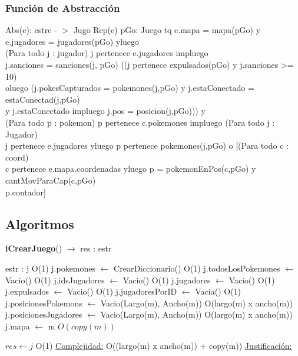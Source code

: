 \begin{Representacion}
\subsubsection{Funci\'on de Abstracci\'on}	
	Abs(e): estre - $>$ Jugo {Rep(e)} 
 pGo: Juego tq e.mapa = mapa(pGo) y e.jugadores = jugadores(pGo) yluego \\
 (Para todo j : jugador) j pertenece e.jugadores impluego 
 \\ j.sanciones = sanciones(j, pGo) ((j pertenece expulsados(pGo) y j.sanciones >= 10)\\
 oluego (j.pokesCapturados = pokemones(j,pGo) y j.estaConectado = estaConectad(j,pGo) \\
 y j.estaConectado impluego j.pos = posicion(j,pGo))) y \\
 (Para todo p : pokemon) p pertenece c.pokemones impluego (Para todo j : Jugador) \\
 j pertenece e.jugadores yluego p pertenece pokemones(j,pGo) o [(Para todo c : coord)\\
 c pertenece e.mapa.coordenadas yluego p = pokemonEnPos(c,pGo) y cantMovParaCap(c,pGo)\\
 p.contador]
\end{Representacion}


\subsection{Algoritmos}

\begin{algorithm}[H]{\textbf{iCrearJuego}() $\to$ res : estr}
	\begin{algorithmic}
		\State estr : j	\Comment O(1)
		\State j.pokemones $\gets$ CrearDiccionario()	\Comment O(1)
		\State j.todosLosPokemones $\gets$ Vacio()	\Comment O(1)
		\State j.idsJugadores $\gets$ Vacio()	\Comment O(1)		
		\State j.jugadores $\gets$ Vacio()	\Comment O(1)
		\State j.expulsados $\gets$ Vacio()	\Comment O(1)
		\State j.jugadoresPorID $\gets$ Vacia()	\Comment O(1)
		\State j.posicionesPokemons $\gets$	Vacio(Largo(m), Ancho(m))	\Comment O(largo(m) x ancho(m))
		\State j.posicionesJugadores $\gets$	Vacio(Largo(m), Ancho(m))	\Comment O(largo(m) x ancho(m))
		\State j.mapa $\gets$ m	\Comment $O(copy(m))$

		\State $res \gets j$ \Comment O(1)
		\medskip
		\Statex \underline{Complejidad:} O((largo(m) x ancho(m)) + copy(m))
		\Statex \underline{Justificación:} 

    \end{algorithmic}
\end{algorithm}

